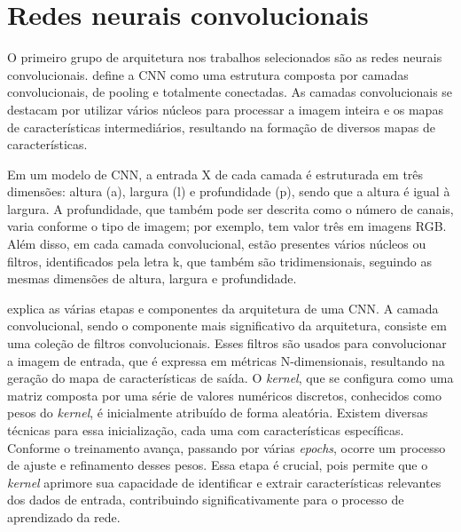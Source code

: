 \section{Redes neurais convolucionais}
\label{subsec:Redes neurais convolucionais}



O primeiro grupo de arquitetura nos trabalhos selecionados são as redes neurais convolucionais. \textcite{CHAI2021100134} define a CNN como uma estrutura composta por camadas convolucionais, de pooling e totalmente conectadas. As camadas convolucionais se destacam por utilizar vários núcleos para processar a imagem inteira e os mapas de características intermediários, resultando na formação de diversos mapas de características.

Em um modelo de CNN, a entrada X de cada camada é estruturada em três dimensões: altura (a), largura (l) e profundidade (p), sendo que a altura é igual à largura. A profundidade, que também pode ser descrita como o número de canais, varia conforme o tipo de imagem; por exemplo, tem valor três em imagens RGB. Além disso, em cada camada convolucional, estão presentes vários núcleos ou filtros, identificados pela letra k, que também são tridimensionais, seguindo as mesmas dimensões de altura, largura e profundidade.

\textcite{Alzubaidi2021} explica as várias etapas e componentes da arquitetura de uma CNN. A camada convolucional, sendo o componente mais significativo da arquitetura, consiste em uma coleção de filtros convolucionais. Esses filtros são usados para convolucionar a imagem de entrada, que é expressa em métricas N-dimensionais, resultando na geração do mapa de características de saída. O \textit{kernel}, que se configura como uma matriz composta por uma série de valores numéricos discretos, conhecidos como pesos do \textit{kernel}, é inicialmente atribuído de forma aleatória. Existem diversas técnicas para essa inicialização, cada uma com características específicas. Conforme o treinamento avança, passando por várias \textit{epochs}, ocorre um processo de ajuste e refinamento desses pesos. Essa etapa é crucial, pois permite que o \textit{kernel} aprimore sua capacidade de identificar e extrair características relevantes dos dados de entrada, contribuindo significativamente para o processo de aprendizado da rede.

